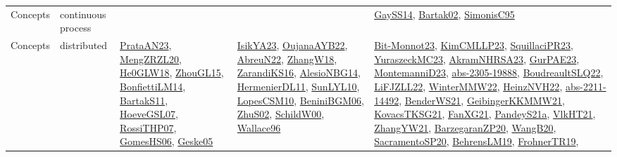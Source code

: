 {\begin{longtable}{lp{3cm}>{\raggedright}p{6cm}>{\raggedright}p{6cm}p{8cm}}
Concepts & continuous process &  &  & \href{papers/GaySS14.pdf}{GaySS14}\cite{GaySS14}, \href{papers/Bartak02.pdf}{Bartak02}\cite{Bartak02}, \href{papers/SimonisC95.pdf}{SimonisC95}\cite{SimonisC95}\\
Concepts & distributed & \href{articles/PrataAN23.pdf}{PrataAN23}\cite{PrataAN23}, \href{articles/MengZRZL20.pdf}{MengZRZL20}\cite{MengZRZL20}, \href{papers/He0GLW18.pdf}{He0GLW18}\cite{He0GLW18}, \href{papers/ZhouGL15.pdf}{ZhouGL15}\cite{ZhouGL15}, \href{papers/BonfiettiLM14.pdf}{BonfiettiLM14}\cite{BonfiettiLM14}, \href{articles/BartakS11.pdf}{BartakS11}\cite{BartakS11}, \href{papers/HoeveGSL07.pdf}{HoeveGSL07}\cite{HoeveGSL07}, \href{papers/RossiTHP07.pdf}{RossiTHP07}\cite{RossiTHP07}, \href{papers/GomesHS06.pdf}{GomesHS06}\cite{GomesHS06}, \href{papers/Geske05.pdf}{Geske05}\cite{Geske05} & \href{articles/IsikYA23.pdf}{IsikYA23}\cite{IsikYA23}, \href{papers/OujanaAYB22.pdf}{OujanaAYB22}\cite{OujanaAYB22}, \href{articles/AbreuN22.pdf}{AbreuN22}\cite{AbreuN22}, \href{articles/ZhangW18.pdf}{ZhangW18}\cite{ZhangW18}, \href{articles/ZarandiKS16.pdf}{ZarandiKS16}\cite{ZarandiKS16}, \href{papers/AlesioNBG14.pdf}{AlesioNBG14}\cite{AlesioNBG14}, \href{papers/HermenierDL11.pdf}{HermenierDL11}\cite{HermenierDL11}, \href{papers/SunLYL10.pdf}{SunLYL10}\cite{SunLYL10}, \href{articles/LopesCSM10.pdf}{LopesCSM10}\cite{LopesCSM10}, \href{papers/BeniniBGM06.pdf}{BeniniBGM06}\cite{BeniniBGM06}, \href{papers/ZhuS02.pdf}{ZhuS02}\cite{ZhuS02}, \href{articles/SchildW00.pdf}{SchildW00}\cite{SchildW00}, \href{articles/Wallace96.pdf}{Wallace96}\cite{Wallace96} & \href{papers/Bit-Monnot23.pdf}{Bit-Monnot23}\cite{Bit-Monnot23}, \href{papers/KimCMLLP23.pdf}{KimCMLLP23}\cite{KimCMLLP23}, \href{papers/SquillaciPR23.pdf}{SquillaciPR23}\cite{SquillaciPR23}, \href{papers/YuraszeckMC23.pdf}{YuraszeckMC23}\cite{YuraszeckMC23}, \href{articles/AkramNHRSA23.pdf}{AkramNHRSA23}\cite{AkramNHRSA23}, \href{articles/GurPAE23.pdf}{GurPAE23}\cite{GurPAE23}, \href{articles/MontemanniD23.pdf}{MontemanniD23}\cite{MontemanniD23}, \href{articles/abs-2305-19888.pdf}{abs-2305-19888}\cite{abs-2305-19888}, \href{papers/BoudreaultSLQ22.pdf}{BoudreaultSLQ22}\cite{BoudreaultSLQ22}, \href{papers/LiFJZLL22.pdf}{LiFJZLL22}\cite{LiFJZLL22}, \href{papers/WinterMMW22.pdf}{WinterMMW22}\cite{WinterMMW22}, \href{articles/HeinzNVH22.pdf}{HeinzNVH22}\cite{HeinzNVH22}, \href{articles/abs-2211-14492.pdf}{abs-2211-14492}\cite{abs-2211-14492}, \href{papers/BenderWS21.pdf}{BenderWS21}\cite{BenderWS21}, \href{papers/GeibingerKKMMW21.pdf}{GeibingerKKMMW21}\cite{GeibingerKKMMW21}, \href{papers/KovacsTKSG21.pdf}{KovacsTKSG21}\cite{KovacsTKSG21}, \href{articles/FanXG21.pdf}{FanXG21}\cite{FanXG21}, \href{articles/PandeyS21a.pdf}{PandeyS21a}\cite{PandeyS21a}, \href{articles/VlkHT21.pdf}{VlkHT21}\cite{VlkHT21}, \href{articles/ZhangYW21.pdf}{ZhangYW21}\cite{ZhangYW21}, \href{papers/BarzegaranZP20.pdf}{BarzegaranZP20}\cite{BarzegaranZP20}, \href{papers/WangB20.pdf}{WangB20}\cite{WangB20}, \href{articles/SacramentoSP20.pdf}{SacramentoSP20}\cite{SacramentoSP20}, \href{papers/BehrensLM19.pdf}{BehrensLM19}\cite{BehrensLM19}, \href{papers/FrohnerTR19.pdf}{FrohnerTR19}\cite{FrohnerTR19}, 
\end{longtable}}

